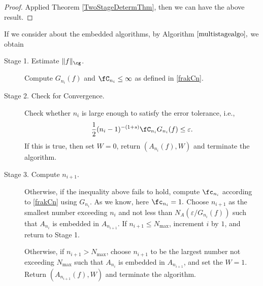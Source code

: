 \begin{proof}
Applied Theorem \ref{TwoStageDetermThm}, then we can have the above result.
\end{proof}


If we consider about the embedded algorithms, by Algorithm $\ref{multistagealgo},$ we obtain
\begin{algo}

\begin{description}

\item [Stage 1. Estimate $\| f \| _{\cg}$.] Compute $G_{n_i}(f)$ and $\fC_{n_i} \le \infty$ as defined in \eqref{frakCn}.

\item [Stage 2. Check for Convergence.] Check whether $n_i$ is large enough to satisfy the error tolerance, i.e.,
\begin{equation} \label{multistageconv}
\frac{1}{2}(n_i-1)^{-(1+s)}\fC_{n_i} G_{n_i}(f) \le \varepsilon.
\end{equation}
If this is true, then set $W=0$, return $(A_{n_i}(f),W)$ and terminate the algorithm.

\item[Stage 3. Compute $n_{i+1}$.]  Otherwise, if the inequality above fails to hold, compute $\fc_{n_i}$ according to \eqref{frakCn} using $G_{n_i}$. As we know, here $\fc_{n_i}=1.$
Choose $n_{i+1}$ as the smallest number exceeding $n_i$ and not less than $N_{A}(\varepsilon /G_{n_i}(f))$ such that $A_{n_{i}}$ is embedded in $A_{n_{i+1}}$. If $n_{i+1} \le N_{\max}$, increment $i$ by $1$, and return to Stage 1.

Otherwise, if $n_{i+1} > N_{\max}$, choose $n_{i+1}$ to be the largest number not exceeding $N_{\max}$ such that $A_{n_{i}}$ is embedded in $A_{n_{i+1}}$, and set the $W=1$. Return $(A_{n_{i+1}}(f),W)$ and terminate the algorithm.
\end{description}

\end{algo}



